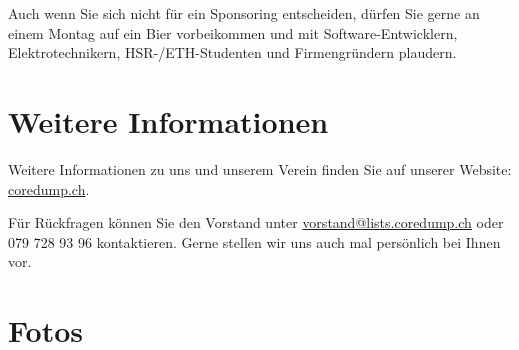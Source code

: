 \documentclass[10pt,a4paper,parskip,fleqn]{scrartcl}
\begin{document}
Auch wenn Sie sich nicht für ein Sponsoring entscheiden, dürfen Sie gerne an
einem Montag auf ein Bier vorbeikommen und mit Software-Entwicklern,
Elektrotechnikern, HSR-/ETH-Studenten und Firmengründern plaudern.

\section{Weitere Informationen}

Weitere Informationen zu uns und unserem Verein finden Sie auf unserer Website:
\url{coredump.ch}.

Für Rückfragen können Sie den Vorstand unter \url{vorstand@lists.coredump.ch}
oder 079 728 93 96 kontaktieren. Gerne stellen wir uns auch mal persönlich bei
Ihnen vor.

\section{Fotos}
\end{document}
